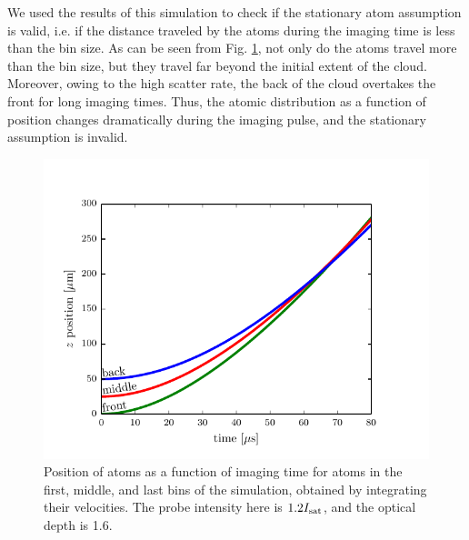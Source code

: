 \documentclass[12pt]{iopart}
\begin{document}
\par We used the results of this simulation to check if the stationary atom assumption is valid, i.e. if the distance traveled by the atoms during the imaging time is less than the bin size. As can be seen from Fig. \ref{fig:atomTravel}, not only do the atoms travel more than the bin size, but they travel far beyond the initial extent of the cloud. Moreover, owing to the high scatter rate, the back of the cloud overtakes the front for long imaging times. Thus, the atomic distribution as a function of position changes dramatically during the imaging pulse, and the stationary assumption is invalid. 
\begin{figure}
	\includegraphics{figure4.pdf}
\caption{Position of atoms as a function of imaging time for atoms in the first, middle, and last bins of the simulation, obtained by integrating their velocities. The probe intensity here is $1.2 I_{\rm{sat}}$, and the optical depth is 1.6.}  
\label{fig:atomTravel}
\end{figure}
\end{document}
